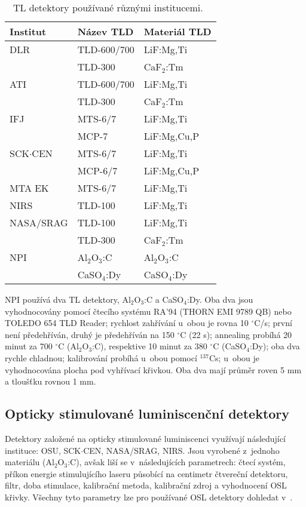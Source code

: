 \begin{table}[H]
  \centering
  \caption{TL detektory používané různými institucemi.~\cite{dosis}}
  \label{tab:dosis_pouzivaneTLD}
  \begin{tabular}{lll}
	\toprule
Institut&Název TLD&Materiál TLD\\
\midrule
DLR			 &TLD-600/700  &LiF:Mg,Ti\\
			 &TLD-300	   &CaF$_2$:Tm\\
ATI			 &TLD-600/700  &LiF:Mg,Ti\\
			 &TLD-300	   &CaF$_2$:Tm\\
IFJ			 &MTS-6/7	   &LiF:Mg,Ti\\
			 &MCP-7		   &LiF:Mg,Cu,P\\
SCK$\cdot$CEN&MTS-6/7	   &LiF:Mg,Ti\\
			 &MCP-6/7	   &LiF:Mg,Cu,P\\
MTA EK		 &MTS-6/7	   &LiF:Mg,Ti\\
NIRS		 &TLD-100	   &LiF:Mg,Ti\\
NASA/SRAG	 &TLD-100	   &LiF:Mg,Ti\\
			 &TLD-300	   &CaF$_2$:Tm\\
NPI			 &Al$_2$O$_3$:C&Al$_2$O$_3$:C\\
			 &CaSO$_4$:Dy  &CaSO$_4$:Dy\\
	\bottomrule
  \end{tabular}
\end{table}

NPI používá dva TL detektory, Al$_2$O$_3$:C a CaSO$_4$:Dy. Oba dva jsou vyhodnocovány pomocí čtecího systému RA’94 (THORN EMI 9789 QB) nebo TOLEDO 654 TLD Reader; rychlost zahřívání u~obou je rovna 10 $^{\circ}$C/s; první není předehříván, druhý je předehříván na 150 $^{\circ}$C (22 s); annealing probíhá 20 minut za 700 $^{\circ}$C (Al$_2$O$_3$:C), respektive 10 minut za 380 $^{\circ}$C (CaSO$_4$:Dy); oba dva rychle chladnou; kalibrování probíhá u~obou pomocí $^{137}$Cs; u~obou je vyhodnocována plocha pod vyhřívací křivkou. Oba dva mají průměr roven 5 mm a tloušťku rovnou 1 mm.
\subsection{Opticky stimulované luminiscenční detektory}
Detektory založené na opticky stimulované luminiscenci využívají následující instituce: OSU, SCK$\cdot$CEN, NASA/SRAG, NIRS. Jsou vyrobené z~jednoho materiálu (Al$_2$O$_3$:C), avšak liší se v~následujících parametrech: čtecí systém, příkon energie stimulujícího laseru působící na centimetr čtvereční detektoru, filtr, doba stimulace, kalibrační metoda, kalibrační zdroj a vyhodnocení OSL křivky. Všechny tyto parametry lze pro používané OSL detektory dohledat v~\cite{dosis}. 
